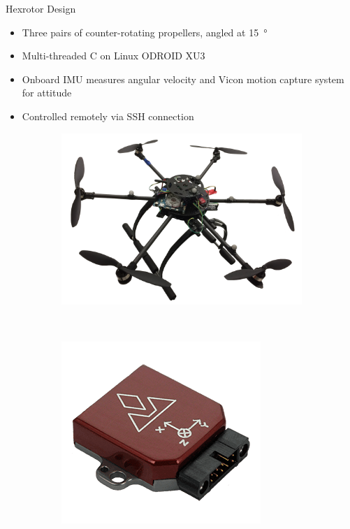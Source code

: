 \begin{frame}{Hexrotor Design} %
    \begin{itemize}
        \item Three pairs of counter-rotating propellers, angled at \SI{15}{\degree}
        \item Multi-threaded C on Linux ODROID XU3
        \item Onboard IMU measures angular velocity and Vicon motion capture system for attitude
        \item Controlled remotely via SSH connection
    \end{itemize}
    
    \begin{figure} 
        \centering 
        \begin{subfigure}[b]{0.4\textwidth} 
            \includegraphics[height=0.4\textheight]{figures/2016ACC/hexrotor_no_background.png} 
        \end{subfigure}~ %
        \begin{subfigure}[b]{0.4\textwidth} 
            \includegraphics[height=0.4\textheight]{figures/2016ACC/vn-100-rugged.png}
        \end{subfigure}
    \end{figure}
\end{frame} %

